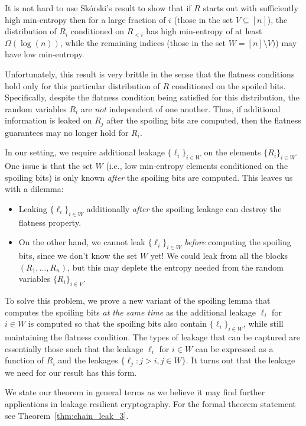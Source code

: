 It is not hard to use Sk\'{o}rski's result to show that if $R$ starts out with sufficiently high min-entropy then for a large fraction of $i$
(those in the set $V \subseteq [n]$), the distribution of $R_i$ conditioned on $R_{<i}$ has high min-entropy of at least $\Omega(\log(n))$, while the remaining indices 
(those in the set $W = [n]\setminus V)$) may have low min-entropy.


Unfortunately, this result is very brittle in the sense that the flatness conditions hold only for this particular distribution of $R$ conditioned on the spoiled bits. Specifically, despite the flatness condition being satisfied for this distribution, the random variables $R_i$ are \emph{not} independent of one another. Thus, if additional information is leaked on $R_j$ after the spoiling bits are computed, then the flatness guarantees may no longer hold for $R_i$.
 
 In our setting, we require additional leakage $\{\ell_i\}_{i \in W}$ on the elements $\{R_i\}_{i \in W}$. 
One issue is that the set $W$ (i.e., low min-entropy elements conditioned on the spoiling bits) is only known \emph{after} the spoiling bits are computed.
This leaves us with a dilemma: 
\begin{itemize}
\item 
Leaking $\{\ell_i\}_{i \in W}$ additionally {\em after} the spoiling leakage can destroy the flatness property.
\item 
On the other hand, 
we cannot 
leak $\{\ell_i\}_{i \in W}$ \emph{before} computing the spoiling bits, 
since we don't know the set $W$ yet! We could leak from all the blocks $(R_1, \ldots, R_n)$, but this may deplete the entropy needed from the random variables $\{R_i\}_{i \in V}$.
\end{itemize}

To solve this problem, we prove a new variant of the spoiling lemma that computes the spoiling bits \emph{at the same time} as the additional leakage $\ell_i$ for $i \in W$ is computed so that the spoiling bits also contain $\{\ell_i\}_{i \in W}$, while still maintaining the flatness condition. 
%
The types of leakage that can be captured are essentially those such that the leakage $\ell_i$ for $i \in W$ can be expressed as a function of $R_i$ and the leakages $\{\ell_j: j > i, j \in W\}$. It turns out that the leakage we need for our result has this form.

We state our theorem in general terms as we believe it may find further applications in leakage resilient cryptography. For the formal theorem statement see Theorem~\ref{thm:chain_leak_3}.

